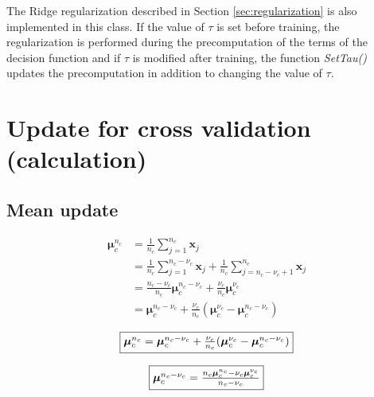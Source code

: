 \documentclass[a4paper]{article}
\begin{document}
        The Ridge regularization described in Section \ref{sec:regularization} is also implemented in this class. If the value of $\tau$ is set before training, the regularization is performed during the precomputation of the terms of the decision function and if $\tau$ is modified after training, the function \emph{SetTau()} updates the precomputation in addition to changing the value of $\tau$.










\newpage
\appendix
\section{Update for cross validation (calculation)}
\label{app:cv_maj}

    \subsection{Mean update}
        \begin{align*}
            \boldsymbol{\mu}_c^{n_c} &= \frac{1}{n_c} \sum_{j = 1}^{n_c} \mathbf{x}_j \\
                        &= \frac{1}{n_c} \sum_{j = 1}^{n_c-\nu_c} \mathbf{x}_j + \frac{1}{n_c} \sum_{j = n_c-\nu_c +1}^{n_c} \mathbf{x}_j \\
                        &= \frac{n_c-\nu_c}{n_c} \boldsymbol{\mu}_c^{n_c-\nu_c} + \frac{\nu_c}{n_c} \boldsymbol{\mu}_c^{\nu_c} \\
                        &= \boldsymbol{\mu}_c^{n_c-\nu_c} + \frac{\nu_c}{n_c} (\boldsymbol{\mu}_c^{\nu_c} - \boldsymbol{\mu}_c^{n_c-\nu_c})
        \end{align*}

        \begin{equation}
             \fbox{$\boldsymbol{\mu}_c^{n_c} = \boldsymbol{\mu}_c^{n_c-\nu_c} + \frac{\nu_c}{n_c} (\boldsymbol{\mu}_c^{\nu_c} - \boldsymbol{\mu}_c^{n_c-\nu_c})$}
        \end{equation}

        \begin{equation}
            \fbox{$\boldsymbol{\mu}_c^{n_c-\nu_c} = \frac{n_c \boldsymbol{\mu}_c^{n_c} - \nu_c \boldsymbol{\mu}_c^{\nu_c}}{n_c - \nu_c}$}
        \end{equation}
\end{document}
